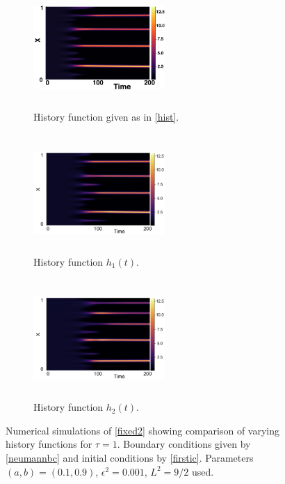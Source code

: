 \begin{figure}[H]
    \centering
    \begin{subfigure}[t]{0.32\textwidth}
        \centering
        \includegraphics[width=5cm,height=4.5cm]{ic21.png}
        \caption{History function given as in \eqref{hist}.}
        \label{}
    \end{subfigure}
    \hfill
    \begin{subfigure}[t]{0.32\textwidth}
        \centering
        \includegraphics[width=5cm,height=4.5cm]{h11.png}
        \caption{History function $h_1(t)$.}
        \label{}
    \end{subfigure}
    \hfill
    \begin{subfigure}[t]{0.32\textwidth}
        \centering
        \includegraphics[width=5cm,height=4.5cm]{h21.png}
        \caption{History function $h_2(t)$.}
        \label{}
    \end{subfigure}
    \caption{Numerical simulations of \eqref{fixed2} showing comparison of varying history functions for $\tau=1$. Boundary conditions given by \eqref{neumannbc} and initial conditions by \eqref{firstic}. Parameters $(a,b)=(0.1,0.9)$, $\epsilon^2=0.001$, $L^2=9/2$ used.}
    \label{fig:temp1}
\end{figure}
